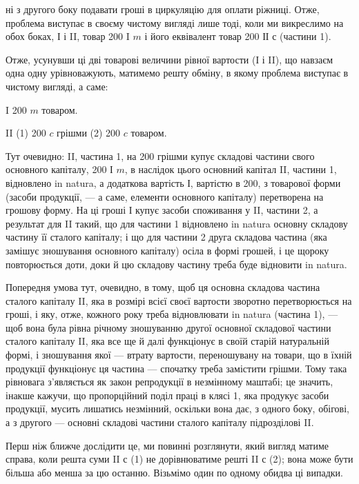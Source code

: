 \parcont{}  %
ні з другого боку подавати гроші в циркуляцію для оплати ріжниці.
Отже, проблема виступає в своєму чистому вигляді лише тоді, коли ми
викреслимо на обох боках, І і II, товар 200 I $m$ і його еквівалент товар
200 ІІ $с$ (частини 1).

Отже, усунувши ці дві товарові величини рівної вартости (І і II),
що навзаєм одна одну урівноважують, матимемо решту обміну, в якому
проблема виступає в чистому вигляді, а саме:

I 200 $m$ товаром.

II (1) 200 $c$ грішми \dplus{} (2) 200 $c$ товаром.

Тут очевидно: II, частина 1, на 200 грішми купує складові частини
свого основного капіталу, 200 І $m$, в наслідок цього основний капітал II,
частини 1, відновлено in natura, а додаткова вартість І, вартістю в 200,
з товарової форми (засоби продукції, — а саме, елементи основного
капіталу) перетворена на грошову форму. На ці гроші І купує засоби
споживання у II, частини 2, а результат для II такий, що для частини 1
відновлено in natura основну складову частину її сталого капіталу; і що
для частини 2 друга складова частина (яка замішує зношування основного
капіталу) осіла в формі грошей, і це щороку повторюється доти,
доки й цю складову частину треба буде відновити in natura.

Попередня умова тут, очевидно, в тому, щоб ця основна складова частина
сталого капіталу II, яка в розмірі всієї своєї вартости зворотно перетворюється
на гроші, і яку, отже, кожного року треба відновлювати in natura
(частина 1), — щоб вона була рівна річному зношуванню другої основної
складової частини сталого капіталу II, яка все ще й далі функціонує в
своїй старій натуральній формі, і зношування якої — втрату вартости,
переношувану на товари, що в їхній продукції функціонує ця частина —
спочатку треба замістити грішми. Тому така рівновага з’являється як
закон репродукції в незмінному маштабі; це значить, інакше кажучи, що
пропорційний поділ праці в клясі 1, яка продукує засоби продукції,
мусить лишатись незмінний, оскільки вона дає, з одного боку, обігові,
а з другого — основні складові частини сталого капіталу підрозділові II.

Перш ніж ближче дослідити це, ми повинні розглянути, який вигляд
матиме справа, коли решта суми II $с$ (1) не дорівнюватиме решті II $с$
(2); вона може бути більша або менша за цю останню. Візьмімо один
по одному обидва ці випадки.

